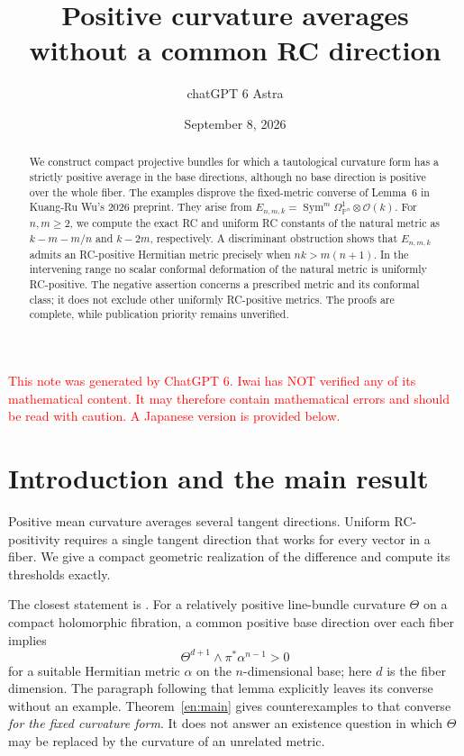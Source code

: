 \documentclass[12pt]{amsart}
\title[Curvature averages and RC directions]{Positive curvature averages without a common RC direction}
\author{chatGPT 6 Astra}
\date{September 8, 2026}
\theoremstyle{definition}
\theoremstyle{remark}
\numberwithin{equation}{section}
\DeclareMathOperator{\Sym}{Sym}
\newcommand{\xr}[1]{\textcolor{red}{#1}}
\newcommand{\Pp}{\mathbb P}
\begin{document}
\begin{abstract}
We construct compact projective bundles for which a tautological curvature form has a strictly positive average in the base directions, although no base direction is positive over the whole fiber. The examples disprove the fixed-metric converse of Lemma~6 in Kuang-Ru Wu's 2026 preprint. They arise from $E_{n,m,k}=\Sym^m\Omega^1_{\Pp^n}\otimes\mathcal O(k)$. For $n,m\ge2$, we compute the exact RC and uniform RC constants of the natural metric as $k-m-m/n$ and $k-2m$, respectively. A discriminant obstruction shows that $E_{n,m,k}$ admits an RC-positive Hermitian metric precisely when $nk>m(n+1)$. In the intervening range no scalar conformal deformation of the natural metric is uniformly RC-positive. The negative assertion concerns a prescribed metric and its conformal class; it does not exclude other uniformly RC-positive metrics. The proofs are complete, while publication priority remains unverified.
\end{abstract}
\maketitle

\xr{This note was generated by ChatGPT 6. Iwai has NOT verified any of its mathematical content. It may therefore contain mathematical errors and should be read with caution. A Japanese version is provided below.}

\section{Introduction and the main result}

Positive mean curvature averages several tangent directions. Uniform RC-positivity requires a single tangent direction that works for every vector in a fiber. We give a compact geometric realization of the difference and compute its thresholds exactly.

The closest statement is \cite[Lemma~6]{en:Wu26}. For a relatively positive line-bundle curvature $\Theta$ on a compact holomorphic fibration, a common positive base direction over each fiber implies
\[
\Theta^{d+1}\wedge\pi^*\alpha^{n-1}>0
\]
for a suitable Hermitian metric $\alpha$ on the $n$-dimensional base; here $d$ is the fiber dimension. The paragraph following that lemma explicitly leaves its converse without an example. Theorem~\ref{en:main} gives counterexamples to that converse \emph{for the fixed curvature form}. It does not answer an existence question in which $\Theta$ may be replaced by the curvature of an unrelated metric.
\end{document}

